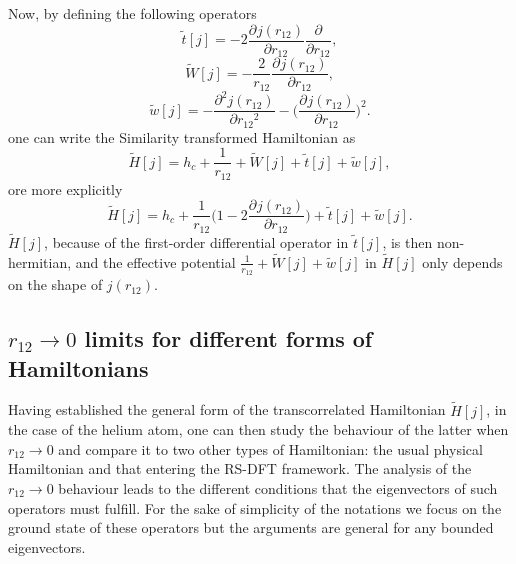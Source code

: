 \documentclass[aip,jcp,reprint,noshowkeys,superscriptaddress]{revtex4-1}
\newcommand{\deriv}[3]{\frac{\partial^{#3} #1}{\partial {#2}^{#3}}}
\begin{document}
Now, by defining the following operators 
\begin{equation}
 \label{eq:def_tt}
 \tilde{t}[j] = -2 \deriv{j(r_{12})}{r_{12}}{} \deriv{}{r_{12}}{},
\end{equation}
\begin{equation}
 \label{eq:def_wt}
 \tilde{W}[j] = -\frac{2}{r_{12}} \deriv{j(r_{12})}{r_{12}}{}  , 
\end{equation}
\begin{equation}
 \label{eq:def_wt}
 \tilde{w}[j] = -\deriv{j(r_{12})}{r_{12}}{2} - \bigg( \deriv{j(r_{12})}{r_{12}}{} \bigg)^2. 
\end{equation}
one can write the Similarity transformed Hamiltonian  as
\begin{equation}
 \label{eq:ht_phi}
 \tilde{H}[j] = h_c + \frac{1}{r_{12}}  + \tilde{W}[j] + \tilde{t}[j] + \tilde{w}[j] ,
\end{equation}
ore more explicitly 
\begin{equation}
 \tilde{H}[j] = h_c + \frac{1}{r_{12}}\bigg( 1 - 2 \deriv{j(r_{12})}{r_{12}}{}\bigg) + \tilde{t}[j] + \tilde{w}[j] .
\end{equation}
$\tilde{H}[j]$, because of the first-order differential operator in $\tilde{t}[j]$, is then non-hermitian,   
and the effective potential $ \frac{1}{r_{12}}  + \tilde{W}[j] + \tilde{w}[j]$ in $\tilde{H}[j]$ only depends on the shape of $j(r_{12})$. 

\subsection{$r_{12} \rightarrow 0$ limits for different forms of Hamiltonians}
\label{sec:cusp}
Having established the general form of the transcorrelated Hamiltonian $\tilde{H}[j]$, in the case of the helium atom, one can then study the behaviour of the latter when $r_{12}\rightarrow 0$ and compare it to two other types of Hamiltonian: the usual physical Hamiltonian and that entering the RS-DFT framework. 
The analysis of the $r_{12}\rightarrow 0$ behaviour leads to the different conditions that the eigenvectors of such operators must fulfill. For the sake of simplicity of the notations we focus on the ground state of these operators but the arguments are general for any bounded eigenvectors. 
\end{document}
